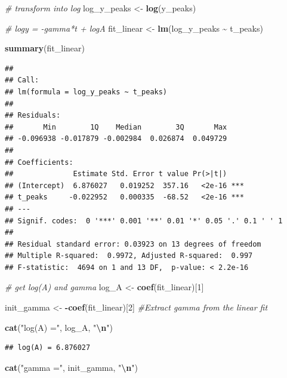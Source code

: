 \documentclass[
]{article}
\newenvironment{Shaded}{\begin{snugshade}}{\end{snugshade}}
\newcommand{\CommentTok}[1]{\textcolor[rgb]{0.56,0.35,0.01}{\textit{#1}}}
\newcommand{\DecValTok}[1]{\textcolor[rgb]{0.00,0.00,0.81}{#1}}
\newcommand{\FunctionTok}[1]{\textcolor[rgb]{0.13,0.29,0.53}{\textbf{#1}}}
\newcommand{\NormalTok}[1]{#1}
\newcommand{\OtherTok}[1]{\textcolor[rgb]{0.56,0.35,0.01}{#1}}
\newcommand{\SpecialCharTok}[1]{\textcolor[rgb]{0.81,0.36,0.00}{\textbf{#1}}}
\newcommand{\StringTok}[1]{\textcolor[rgb]{0.31,0.60,0.02}{#1}}
\begin{document}
\begin{Shaded}
\begin{Highlighting}[]
\CommentTok{\# transform into log}
\NormalTok{log\_y\_peaks }\OtherTok{\textless{}{-}} \FunctionTok{log}\NormalTok{(y\_peaks)}

\CommentTok{\# logy = {-}gamma*t + logA}
\NormalTok{fit\_linear }\OtherTok{\textless{}{-}} \FunctionTok{lm}\NormalTok{(log\_y\_peaks }\SpecialCharTok{\textasciitilde{}}\NormalTok{ t\_peaks) }

\FunctionTok{summary}\NormalTok{(fit\_linear)}
\end{Highlighting}
\end{Shaded}

\begin{verbatim}
## 
## Call:
## lm(formula = log_y_peaks ~ t_peaks)
## 
## Residuals:
##       Min        1Q    Median        3Q       Max 
## -0.096938 -0.017879 -0.002984  0.026874  0.049729 
## 
## Coefficients:
##              Estimate Std. Error t value Pr(>|t|)    
## (Intercept)  6.876027   0.019252  357.16   <2e-16 ***
## t_peaks     -0.022952   0.000335  -68.52   <2e-16 ***
## ---
## Signif. codes:  0 '***' 0.001 '**' 0.01 '*' 0.05 '.' 0.1 ' ' 1
## 
## Residual standard error: 0.03923 on 13 degrees of freedom
## Multiple R-squared:  0.9972, Adjusted R-squared:  0.997 
## F-statistic:  4694 on 1 and 13 DF,  p-value: < 2.2e-16
\end{verbatim}

\begin{Shaded}
\begin{Highlighting}[]
\CommentTok{\# get log(A)  and  gamma}
\NormalTok{log\_A }\OtherTok{\textless{}{-}} \FunctionTok{coef}\NormalTok{(fit\_linear)[}\DecValTok{1}\NormalTok{]}

\NormalTok{init\_gamma }\OtherTok{\textless{}{-}} \SpecialCharTok{{-}}\FunctionTok{coef}\NormalTok{(fit\_linear)[}\DecValTok{2}\NormalTok{] }\CommentTok{\#Extract gamma from the linear fit}

\FunctionTok{cat}\NormalTok{(}\StringTok{"log(A) ="}\NormalTok{, log\_A, }\StringTok{"}\SpecialCharTok{\textbackslash{}n}\StringTok{"}\NormalTok{)}
\end{Highlighting}
\end{Shaded}

\begin{verbatim}
## log(A) = 6.876027
\end{verbatim}

\begin{Shaded}
\begin{Highlighting}[]
\FunctionTok{cat}\NormalTok{(}\StringTok{"gamma ="}\NormalTok{, init\_gamma, }\StringTok{"}\SpecialCharTok{\textbackslash{}n}\StringTok{"}\NormalTok{)}
\end{Highlighting}
\end{Shaded}
\end{document}
